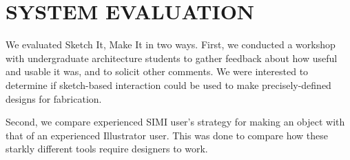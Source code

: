 \documentclass{article}
\begin{document}
\section{SYSTEM EVALUATION}

We evaluated Sketch It, Make It in two ways. First, we conducted a
workshop with undergraduate architecture students to gather feedback
about how useful and usable it was, and to solicit other comments. We
were interested to determine if sketch-based interaction could be used
to make precisely-defined designs for fabrication.

Second, we compare experienced SIMI user's strategy for making an
object with that of an experienced Illustrator user. This was done to
compare how these starkly different tools require designers to work.

\begin{figure}[t]
\centering {}
\\
\end{figure}
\end{document}
